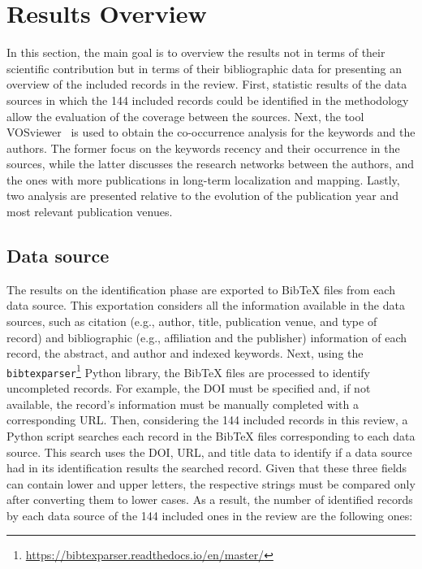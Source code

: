 \section{Results Overview}
\label{sec:overview}

In this section, the main goal is to overview the results not in terms of their scientific contribution but in terms of their bibliographic data for presenting an overview of the included records in the review. First, statistic results of the data sources in which the 144 included records could be identified in the methodology allow the evaluation of the coverage between the sources.
Next, the tool VOSviewer~\parencite{results:vosviewer:1,results:vosviewer:2} is used to obtain the co-occurrence analysis for the keywords and the authors. The former focus on the keywords recency and their occurrence in the sources, while the latter discusses the research networks between the authors, and the ones with more publications in long-term localization and mapping.
Lastly, two analysis are presented relative to the evolution of the publication year and most relevant publication venues.

\subsection{Data source}
\label{sec:overview:db}

The results on the identification phase are exported to BibTeX files from each data source. This exportation considers all the information available in the data sources, such as citation (e.g., author, title, publication venue, and type of record) and bibliographic (e.g., affiliation and the publisher) information of each record, the abstract, and author and indexed keywords. Next, using the \texttt{bibtexparser}\footnote{\url{https://bibtexparser.readthedocs.io/en/master/}} Python library, the BibTeX files are processed to identify uncompleted records. For example, the DOI must be specified and, if not available, the record's information must be manually completed with a corresponding URL. Then, considering the 144 included records in this review, a Python script searches each record in the BibTeX files corresponding to each data source. This search uses the DOI, URL, and title data to identify if a data source had in its identification results the searched record. Given that these three fields can contain lower and upper letters, the respective strings must be compared only after converting them to lower cases. As a result, the number of identified records by each data source of the 144 included ones in the review are the following ones:

